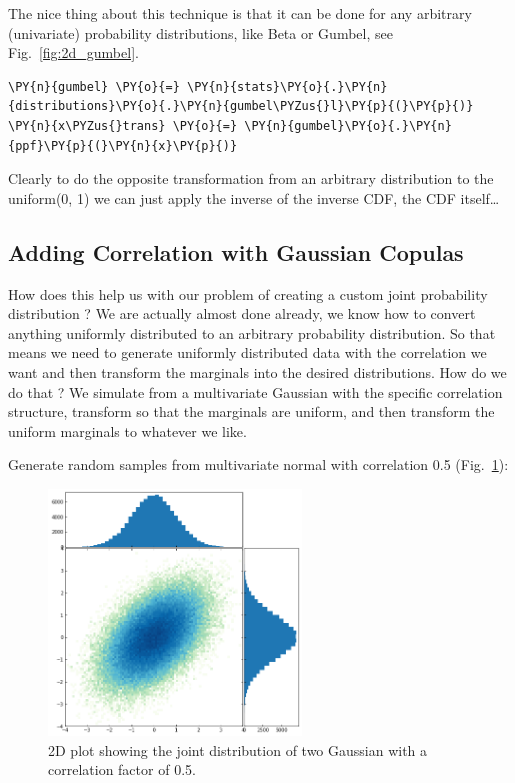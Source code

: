  The nice thing about this technique is that it can be
done for any arbitrary (univariate) probability distributions, like Beta
or Gumbel, see Fig.~\ref{fig:2d_gumbel}.

\begin{tcolorbox}[breakable, size=fbox, boxrule=1pt, pad at break*=1mm,colback=cellbackground, colframe=cellborder]
\begin{Verbatim}[commandchars=\\\{\}]
\PY{n}{gumbel} \PY{o}{=} \PY{n}{stats}\PY{o}{.}\PY{n}{distributions}\PY{o}{.}\PY{n}{gumbel\PYZus{}l}\PY{p}{(}\PY{p}{)}
\PY{n}{x\PYZus{}trans} \PY{o}{=} \PY{n}{gumbel}\PY{o}{.}\PY{n}{ppf}\PY{p}{(}\PY{n}{x}\PY{p}{)}
\end{Verbatim}
\end{tcolorbox}       

    Clearly to do the opposite transformation from an arbitrary distribution
to the uniform(0, 1) we can just apply the inverse of the inverse CDF,
the CDF itself\ldots

\subsection{Adding Correlation with Gaussian
Copulas}\label{adding-correlation-with-gaussian-copulas}

How does this help us with our problem of creating a custom joint
probability distribution ? We are actually almost done already, we know
how to convert anything uniformly distributed to an arbitrary
probability distribution. So that means we need to generate uniformly
distributed data with the correlation we want and then transform the
marginals into the desired distributions. How do we do that ? We
simulate from a multivariate Gaussian with the specific correlation
structure, transform so that the marginals are uniform, and then
transform the uniform marginals to whatever we like.

Generate random samples from multivariate normal with correlation 0.5 (Fig.~\ref{fig:gausswithcorr}):
       \begin{figure}[htbp]
    \centering
    \includegraphics[width=0.6\textwidth]{copula_files/copula_9_0.png}
    \caption{2D plot showing the joint distribution of two Gaussian with a correlation factor of 0.5.}
    \label{fig:gausswithcorr}
    \end{figure}
 
